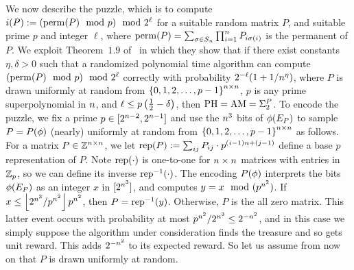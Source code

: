 \begin{proofof}{}
\noindent We now describe the puzzle, which is to compute 
$i(P) := (\operatorname{perm}(P) \mod p) \mod 2^\ell$ for a suitable random matrix $P$,
and suitable prime $p$ and integer $\ell$, where 
$\operatorname{perm}(P) = \sum_{\sigma \in S_{n}} \prod_{i=1}^n P_{i\sigma(i)}$ is the permanent of $P$.
We exploit Theorem~$1.9$ 
of~\citet{FeigeL97} in which they show that if there exist constants
$\eta, \delta > 0$ such that a randomized polynomial time algorithm can
compute $(\operatorname{perm}(P) \mod p) \mod 2^\ell$ correctly with probability 
$2^{-\ell}(1 + 1/n^\eta)$, where $P$ is drawn uniformly at random from 
$\left\{0,1,2, \ldots, p-1\right\}^{n \times n}$, $p$ is any prime
superpolynomial in $n$, and $\ell \le p \left( {\frac{1}{2} - \delta} \right) $,
then $\textrm{PH} = \textrm{AM} = \Sigma^P_2$.
%
To encode the puzzle, 
%
%
%
we fix a prime $p \in [2^{n-2}, 2^{n-1}]$ and use the $n^3$ bits of
${\color{black}{\ensuremath{\phi}}}(E_P)$ to sample $P = P({\color{black}{\ensuremath{\phi}}})$ (nearly) uniformly at random from 
$\left\{0,1,2, \ldots, p-1\right\}^{n \times n}$ as follows.
For a matrix $P \in \mathbb{Z}^{n \times n}$, we let $\operatorname{rep}(P) := \sum_{ij}P_{ij}\cdot
p^{(i-1)n+(j-1)}$ define a base $p$ representation of $P$.
Note $\operatorname{rep}(\cdot)$ is one-to-one for $n \times n$ matrices with entries in
$\mathbb{Z}_{p}$, so we can define its inverse 
$\operatorname{rep}^{-1}(\cdot)$.
The encoding $P({\color{black}{\ensuremath{\phi}}})$ interprets the bits ${\color{black}{\ensuremath{\phi}}}(E_{P})$ as
an integer $x$ in $[2^{n^3}]$, and computes $y = x \mod (p^{n^2})$.
If $x \le \left\lfloor2^{n^3}/p^{n^2}\right\rfloor p^{n^2}$, then $P =
\operatorname{rep}^{-1}(y)$.
Otherwise, $P$ is the all zero matrix.
This latter event occurs with probability at most $p^{n^2}/2^{n^3} \le
2^{-n^2}$, and in this case we simply suppose the 
algorithm under consideration finds the treasure and so gets unit reward.
This adds $2^{-n^2}$ to its expected reward.
So let us assume from now on that $P$ is drawn uniformly at random.



\end{proofof}
